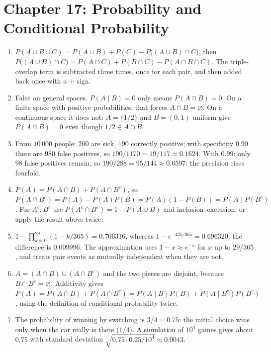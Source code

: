 \section*{Chapter 17: Probability and Conditional Probability}
\begin{enumerate}[label=\textbf{17.\arabic*}]
  \item 
$P(A\cup B\cup C)=P(A\cup B)+P(C)-P\bigl((A\cup B)\cap C\bigr)$, then
        $P\bigl((A\cup B)\cap C\bigr)=P(A\cap C)+P(B\cap C)-P(A\cap B\cap C)$. The
        triple-overlap term is subtracted three times, once for each pair, and then
        added back once with a $+$ sign.

  \item False on general spaces. $P(A\mid B)=0$ only means $P(A\cap B)=0$. On a
        finite space with positive probabilities, that forces $A\cap B=\varnothing$.
        On a continuous space it does not: $A=\{1/2\}$ and $B=(0,1)$ uniform give
        $P(A\cap B)=0$ even though $1/2\in A\cap B$.

  \item From $10\,000$ people: $200$ are sick, $190$ correctly positive; with specificity
        $0.90$ there are $980$ false positives, so $190/1170=19/117\approx0.1624$.
        With $0.99$: only $98$ false positives remain, so $190/288=95/144
        \approx0.6597$: the precision rises fourfold.

  \item $P(A)=P(A\cap B)+P(A\cap B^{c})$, so
        $P(A\cap B^{c})=P(A)-P(A)P(B)=P(A)(1-P(B))=P(A)P(B^{c})$. For
        $A^{c},B^{c}$ use $P(A^{c}\cap B^{c})=1-P(A\cup B)$ and inclusion--exclusion,
        or apply the result above twice.

  \item $1-\prod_{k=0}^{29}(1-k/365)=0.706316$, whereas
        $1-e^{-435/365}=0.696320$; the difference is $0.009996$. The approximation uses
        $1-x\approx e^{-x}$ for $x$ up to $29/365$, and treats pair events
        as mutually independent when they are not.

  \item $A=(A\cap B)\cup(A\cap B^{c})$ and the two pieces are disjoint, because
        $B\cap B^{c}=\varnothing$. Additivity gives
        $P(A)=P(A\cap B)+P(A\cap B^{c})=P(A\mid B)P(B)+P(A\mid B^{c})P(B^{c})$,
        using the definition of conditional probability twice.

  \item The probability of winning by switching is $3/4=0.75$: the initial choice wins
        only when the car really is there ($1/4$). A simulation of $10^{4}$ games gives
        about $0.75$ with standard deviation $\sqrt{0.75\cdot0.25/10^{4}}\approx0.0043$.


\end{enumerate}
